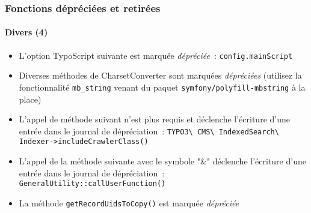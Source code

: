 \begin{frame}[fragile]
	\frametitle{Fonctions dépréciées et retirées}
	\framesubtitle{Divers (4)}


	\begin{itemize}

		\item L'option TypoScript suivante est marquée \textit{dépréciée}~:\newline
			\texttt{config.mainScript}

		\item Diverses méthodes de CharsetConverter sont marquées \textit{dépréciées}\newline
			\small
				(utilisez la fonctionnalité \texttt{mb\_string} venant du paquet
				\texttt{symfony/polyfill-mbstring} à la place)
			\normalsize

		\item L'appel de méthode suivant n'est plus requis et déclenche l'écriture d'une entrée
		    dans le journal de dépréciation~:
			\small\texttt{TYPO3\textbackslash
				CMS\textbackslash
				IndexedSearch\textbackslash
				Indexer->includeCrawlerClass()}
			\normalsize

		\item L'appel de la méthode suivante avec le symbole "\&" déclenche l'écriture d'une entrée
			dans le journal de dépréciation~:
			\small\texttt{GeneralUtility::callUserFunction()}\normalsize

		\item La méthode \texttt{getRecordUidsToCopy()} est marquée \textit{dépréciée}

	\end{itemize}

\end{frame}









